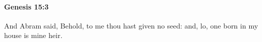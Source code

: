 
		\paragraph{Genesis 15:3} %
			\label{GENESIS-15-3}

			And Abram said, Behold, to me thou hast given no seed: and, lo, one born in my house is mine heir.


